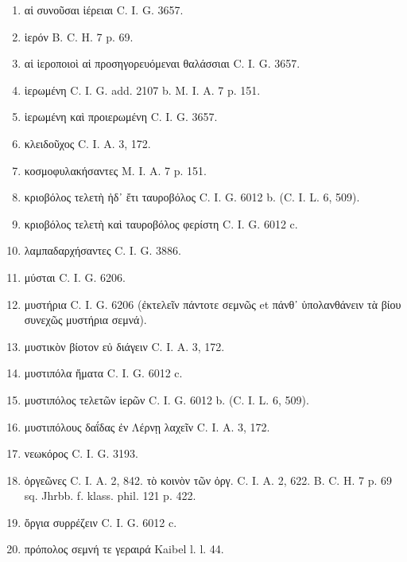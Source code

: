 \documentclass[a4paper, 11pt, oneside, polutonikogreek, german, twocolumn]{article}
\begin{document}
\begin{enumerate}
\item αἱ συνοῦσαι ἱέρειαι C. I. G. 3657.

\item ἱερόν B. C. H. 7 p. 69.

\item αἱ ἱεροποιοὶ αἱ προσηγορευόμεναι θαλάσσιαι C. I. G. 3657.

\item ἱερωμένη C. I. G. add. 2107 b. M. I. A. 7 p. 151.

\item ἱερωμένη καὶ προιερωμένη C. I. G. 3657.

\item κλειδοῦχος C. I. A. 3, 172.

\item κοσμοφυλακήσαντες M. I. A. 7 p. 151.

\item κριοβόλος τελετὴ ἠδ᾽ ἔτι ταυροβόλος C. I. G. 6012 b. (C. I. L. 6, 509).

\item κριοβόλος τελετὴ καὶ ταυροβόλος φερίστη C. I. G. 6012 c.

\item λαμπαδαρχήσαντες C. I. G. 3886.

\item μύσται C. I. G. 6206.

\item μυστήρια C. I. G. 6206 (ἐκτελεῖν πάντοτε σεμνῶς et πάνθ᾽ ὑπολανθάνειν τὰ βίου συνεχῶς μυστήρια σεμνά).

\item μυστικὸν βίοτον εὐ διάγειν C. I. A. 3, 172.

\item μυστιπόλα ἤματα C. I. G. 6012 c.

\item μυστιπόλος τελετῶν ἱερῶν C. I. G. 6012 b. (C. I. L. 6, 509).

\item μυστιπόλους δαΐδας ἐν Λέρνῃ λαχεῖν C. I. A. 3, 172.

\item νεωκόρος C. I. G. 3193.

\item ὀργεῶνες C. I. A. 2, 842. τὸ κοινὸν τῶν ὀργ. C. I. A. 2, 622. B. C. H. 7 p. 69 sq. Jhrbb. f. klass. phil. 121 p. 422.

\item ὄργια συρρέζειν C. I. G. 6012 c.

\item πρόπολος σεμνή τε γεραιρά Kaibel l. l. 44.


\end{enumerate}
\end{document}
